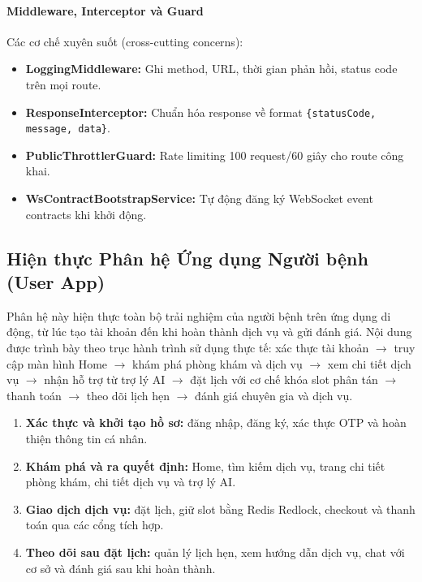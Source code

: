 \paragraph{Middleware, Interceptor và Guard}

Các cơ chế xuyên suốt (cross-cutting concerns):

\begin{itemize}
    \item \textbf{LoggingMiddleware:} Ghi method, URL, thời gian phản hồi, status code trên mọi route.
    \item \textbf{ResponseInterceptor:} Chuẩn hóa response về format \texttt{\{statusCode, message, data\}}.
    \item \textbf{PublicThrottlerGuard:} Rate limiting 100 request/60 giây cho route công khai.
    \item \textbf{WsContractBootstrapService:} Tự động đăng ký WebSocket event contracts khi khởi động.
\end{itemize}


\subsection{Hiện thực Phân hệ Ứng dụng Người bệnh (User App)}

Phân hệ này hiện thực toàn bộ trải nghiệm của người bệnh trên ứng dụng di động, từ lúc tạo tài khoản đến khi hoàn thành dịch vụ và gửi đánh giá. Nội dung được trình bày theo trục hành trình sử dụng thực tế: xác thực tài khoản $\rightarrow$ truy cập màn hình Home $\rightarrow$ khám phá phòng khám và dịch vụ $\rightarrow$ xem chi tiết dịch vụ $\rightarrow$ nhận hỗ trợ từ trợ lý AI $\rightarrow$ đặt lịch với cơ chế khóa slot phân tán $\rightarrow$ thanh toán $\rightarrow$ theo dõi lịch hẹn $\rightarrow$ đánh giá chuyên gia và dịch vụ.

\begin{enumerate}
    \item \textbf{Xác thực và khởi tạo hồ sơ:} đăng nhập, đăng ký, xác thực OTP và hoàn thiện thông tin cá nhân.
    \item \textbf{Khám phá và ra quyết định:} Home, tìm kiếm dịch vụ, trang chi tiết phòng khám, chi tiết dịch vụ và trợ lý AI.
    \item \textbf{Giao dịch dịch vụ:} đặt lịch, giữ slot bằng Redis Redlock, checkout và thanh toán qua các cổng tích hợp.
    \item \textbf{Theo dõi sau đặt lịch:} quản lý lịch hẹn, xem hướng dẫn dịch vụ, chat với cơ sở và đánh giá sau khi hoàn thành.
\end{enumerate}

